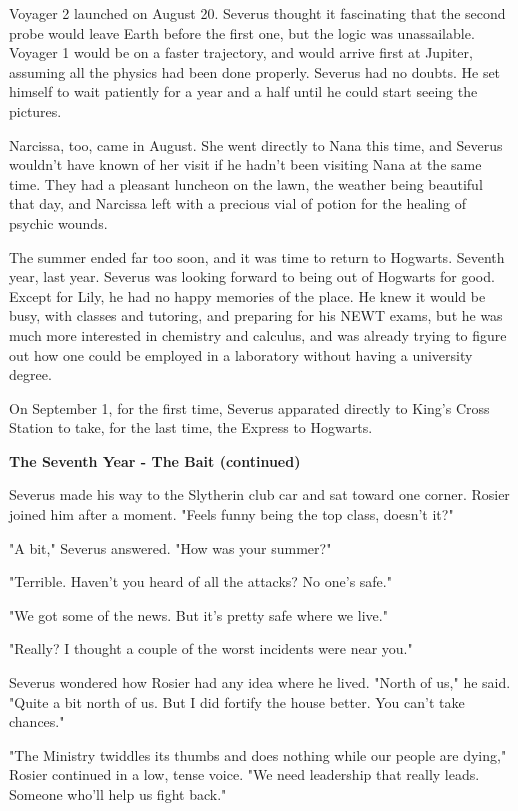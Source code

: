 \documentclass[a4paper,11pt]{article}
\begin{document}
Voyager 2 launched on August 20. Severus thought it fascinating that the second probe would leave Earth before the first one, but the logic was unassailable. Voyager 1 would be on a faster trajectory, and would arrive first at Jupiter, assuming all the physics had been done properly. Severus had no doubts. He set himself to wait patiently for a year and a half until he could start seeing the pictures.

Narcissa, too, came in August. She went directly to Nana this time, and Severus wouldn't have known of her visit if he hadn't been visiting Nana at the same time. They had a pleasant luncheon on the lawn, the weather being beautiful that day, and Narcissa left with a precious vial of potion for the healing of psychic wounds.

The summer ended far too soon, and it was time to return to Hogwarts. Seventh year, last year. Severus was looking forward to being out of Hogwarts for good. Except for Lily, he had no happy memories of the place. He knew it would be busy, with classes and tutoring, and preparing for his NEWT exams, but he was much more interested in chemistry and calculus, and was already trying to figure out how one could be employed in a laboratory without having a university degree.

On September 1, for the first time, Severus apparated directly to King's Cross Station to take, for the last time, the Express to Hogwarts.

\textbf{The Seventh Year - The Bait (continued)}

Severus made his way to the Slytherin club car and sat toward one corner. Rosier joined him after a moment. "Feels funny being the top class, doesn't it?"

"A bit," Severus answered. "How was your summer?"

"Terrible. Haven't you heard of all the attacks? No one's safe."

"We got some of the news. But it's pretty safe where we live."

"Really? I thought a couple of the worst incidents were near you."

Severus wondered how Rosier had any idea where he lived. "North of us," he said. "Quite a bit north of us. But I did fortify the house better. You can't take chances."

"The Ministry twiddles its thumbs and does nothing while our people are dying," Rosier continued in a low, tense voice. "We need leadership that really leads. Someone who'll help us fight back."
\end{document}
